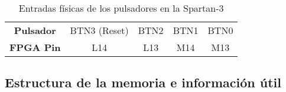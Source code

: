     \begin{table}[H]
            \centering
            \begin{tabular}{|c|c|c|c|c|}
                \hline
                \rowcolor[rgb]{0.21,0.69,0.87}\multicolumn{5}{|c|}{  \textbf{ {Entradas Pulsadores}}} \\
                \hline \hline
                \textbf{  Pulsador  } & BTN3 (Reset) & BTN2 & BTN1 & BTN0  \\
                \hline
                \textbf{  FPGA Pin  } & L14 & L13 & M14 & M13  \\
                \hline
                 
            \end{tabular}
        \caption{ Entradas físicas de los pulsadores en la Spartan-3 }
        \label{tab:tablaEntradasPulsadores}
    \end{table}

%

%                 

\subsection{Estructura de la memoria e información útil}

